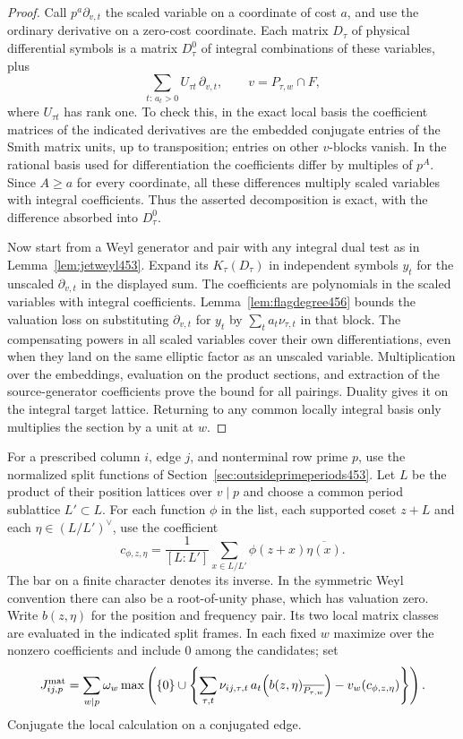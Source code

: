 \documentclass[a4paper,11pt]{article}
\theoremstyle{definition}
\theoremstyle{remark}
\numberwithin{equation}{section}
\begin{document}
\begin{proof}
Call \(p^a\partial_{v,t}\) the scaled variable on a coordinate
of cost \(a\), and use the ordinary derivative on a zero-cost
coordinate. Each matrix \(D_\tau\) of physical differential
symbols is a matrix \(D_\tau^0\) of integral combinations
of these variables, plus
\[
         \sum_{t:\,a_t>0} U_{\tau t}\,\partial_{v,t},
                     \qquad v=P_{\tau,w}\cap F ,
\]
where \(U_{\tau t}\) has rank one. To check this, in the exact
local basis the coefficient matrices of the indicated
derivatives are the embedded conjugate entries of the Smith
matrix units, up to transposition; entries on other \(v\)-blocks
vanish. In the rational basis used for differentiation the
coefficients differ by multiples of \(p^A\). Since \(A\ge a\)
for every coordinate, all these differences multiply scaled
variables with integral coefficients. Thus the asserted
decomposition is exact, with the difference absorbed into
\(D_\tau^0\).

Now start from a Weyl generator and pair with any integral
dual test as in Lemma~\ref{lem:jetweyl453}. Expand its
\(K_\tau(D_\tau)\) in independent symbols \(y_t\) for the
unscaled \(\partial_{v,t}\) in the displayed sum. The
coefficients are polynomials in the scaled variables with
integral coefficients. Lemma~\ref{lem:flagdegree456} bounds
the valuation loss on substituting \(\partial_{v,t}\) for
\(y_t\) by \(\sum_t a_t\nu_{\tau,t}\) in that block.
The compensating powers in all scaled variables cover their
own differentiations, even when they land on the same
elliptic factor as an unscaled variable. Multiplication over
the embeddings, evaluation on the product sections, and
extraction of the source-generator coefficients prove the
bound for all pairings. Duality gives it on the integral
target lattice. Returning to any common locally integral
basis only multiplies the section by a unit at \(w\).
\end{proof}

For a prescribed column \(i\), edge \(j\), and nonterminal
row prime \(p\), use the normalized split functions of
Section~\ref{sec:outsideprimeperiods453}. Let \(L\) be the
product of their position lattices over \(v\mid p\) and choose
a common period sublattice \(L'\subset L\). For each function
\(\phi\) in the list, each supported coset \(z+L\) and each
\(\eta\in(L/L')^\vee\), use the coefficient
\[
         c_{\phi,z,\eta}=\frac1{[L:L']}
                    \sum_{x\in L/L'}\phi(z+x)\overline{\eta(x)} .
\]
The bar on a finite character denotes its inverse. In the
symmetric Weyl convention there can also be a root-of-unity
phase, which has valuation zero. Write \(b(z,\eta)\) for
the position and frequency pair. Its two local matrix
classes are evaluated in the indicated split frames.
In each fixed \(w\) maximize over the nonzero coefficients
and include \(0\) among the candidates; set
\[
 J^{\rm mat}_{ij,p}=
 \sum_{w\mid p}\omega_w
   \max\left(\{0\}\cup
    \left\{\sum_{\tau,t}\nu_{ij,\tau,t}\,
           a_t\!\left(b(z,\eta)_{\overline{P_{\tau,w}}}\right)
              -v_w(c_{\phi,z,\eta})\right\}\right).
\]
Conjugate the local calculation on a conjugated edge.
\end{document}
